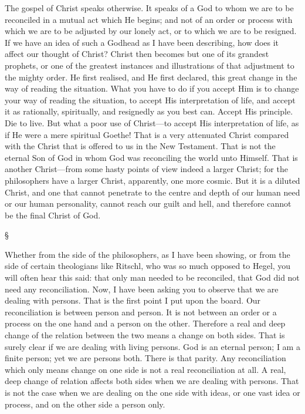 \documentclass[12pt,a5paper,twoside,titlepage]{book}
\begin{document}
The gospel of Christ speaks otherwise. It 
speaks of a God to whom we are to be reconciled 
in a mutual act which He begins; and not of 
an order or process with which we are to be 
adjusted by our lonely act, or to which we are 
to be resigned. If we have an idea of such a 
Godhead as I have been describing, how does 
it affect our thought of Christ? Christ then 
becomes but one of its grandest prophets, or 
one of the greatest instances and illustrations of 
that adjustment to the mighty order. He first 
realised, and He first declared, this great change 
in the way of reading the situation. What you 
have to do if you accept Him is to change your 
way of reading the situation, to accept His 
interpretation of life, and accept it as rationally, 
spiritually, and resignedly as you best can. 
Accept His principle. Die to live. But what a 
poor use of Christ---to accept His interpretation 
of life, as if He were a mere spiritual Goethe! 
That is a very attenuated Christ compared with 
the Christ that is offered to us in the New 
Testament. That is not the eternal Son of God 
in whom God was reconciling the world unto 
Himself. That is another Christ---from some 
hasty points of view indeed a larger Christ; 
for the philosophers have a larger Christ, apparently,
one more cosmic. But it is a diluted 
Christ, and one that cannot penetrate to the 
centre and depth of our human need or our 
human personality, cannot reach our guilt and 
hell, and therefore cannot be the final Christ 
of God. 

\begin{center}
\S
\end{center}

Whether from the side of the philosophers, as 
I have been showing, or from the side of certain 
theologians like Ritschl, who was so much 
opposed to Hegel, you will often hear this 
said: that only man needed to be reconciled, 
that God did not need any reconciliation. 
Now, I have been asking you to observe that 
we are dealing with persons. That is the first 
point I put upon the board. Our reconciliation 
is between person and person. It is not 
between an order or a process on the one hand 
and a person on the other. Therefore a real 
and deep change of the relation between the 
two means a change on both sides. That is 
surely clear if we are dealing with living persons. 
God is an eternal person; I am a finite 
person; yet we are persons both. There is that 
parity. Any reconciliation which only means 
change on one side is not a real reconciliation 
at all. A real, deep change of relation affects 
both sides when we are dealing with persons. 
That is not the case when we are dealing on 
the one side with ideas, or one vast idea 
or process, and on the other side a person 
only. 
\end{document}
